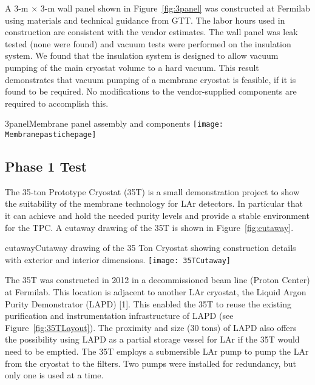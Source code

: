 A 3-m $\times$ 3-m wall panel shown in Figure~\ref{fig:3panel} was constructed at Fermilab using materials and technical guidance from GTT. The labor hours used in construction are consistent with the vendor estimates. The wall panel was leak tested (none were found) and vacuum tests were performed on the insulation system. We found that the insulation system is designed to allow vacuum pumping of the main cryostat volume to a hard vacuum. This result demonstrates that vacuum pumping of a membrane cryostat is feasible, if it is found to be required. No modifications to the vendor-supplied components are required to accomplish this.


\begin{cdrfigure}{3panel}{Membrane panel assembly and components}
\texttt{[image: Membranepastichepage]}
\end{cdrfigure}


\subsection{Phase 1 Test}

The 35-ton Prototype Cryostat (35T) is a small demonstration project to show the suitability of the 
membrane technology for LAr detectors. In particular that it can achieve and hold the needed purity 
levels and provide a stable environment for the TPC. A cutaway drawing of the 35T is shown in 
Figure~\ref{fig:cutaway}.


\begin{cdrfigure}{cutaway}{Cutaway drawing of the 35 Ton Cryostat showing construction details with exterior and interior dimensions.}
  \texttt{[image: 35TCutaway]}
\end{cdrfigure}

The 35T was constructed in 2012 in a decommissioned beam line (Proton Center) at Fermilab. This 
location is adjacent to another LAr cryostat, the Liquid Argon Purity Demonstrator (LAPD) [1].\fixme{}
 This 
enabled the 35T to reuse the existing purification and instrumentation infrastructure of LAPD (see 
Figure~\ref{fig:35TLayout}). The proximity and size (30 tons) of LAPD also offers the possibility using LAPD as 
a partial storage vessel for LAr if the 35T would need to be emptied. The 35T employs a submersible LAr 
pump to pump the LAr from the cryostat to the filters. Two pumps were installed for redundancy, but 
only one is used at a time.

